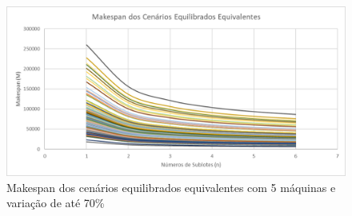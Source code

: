 \begin{figure}[!ht]
    \centering
    \includegraphics[width=12cm]{Resultados/Figuras/Meq05_70}
    \caption{Makespan dos cenários equilibrados equivalentes com 5 máquinas e variação de até 70\%}
    \label{fig:Meq05_70}
\end{figure}